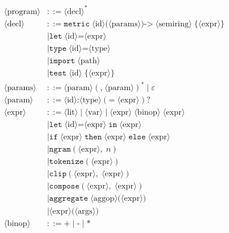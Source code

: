 \documentclass[11pt]{article}
\begin{document}
\begin{align*}
\langle\text{program}\rangle &::= \langle\text{decl}\rangle^* \\[4pt]
\langle\text{decl}\rangle &::= \texttt{metric}\; \langle\text{id}\rangle
  \texttt{(}\langle\text{params}\rangle\texttt{)}
  \texttt{->}\; \langle\text{semiring}\rangle\;
  \texttt{\{}\langle\text{expr}\rangle\texttt{\}} \\
  &\mid \texttt{let}\; \langle\text{id}\rangle \texttt{=}
  \langle\text{expr}\rangle \\
  &\mid \texttt{type}\; \langle\text{id}\rangle \texttt{=}
  \langle\text{type}\rangle \\
  &\mid \texttt{import}\; \langle\text{path}\rangle \\
  &\mid \texttt{test}\; \langle\text{id}\rangle\;
  \texttt{\{}\langle\text{expr}\rangle\texttt{\}} \\[4pt]
\langle\text{params}\rangle &::= \langle\text{param}\rangle
  (\texttt{,}\;\langle\text{param}\rangle)^* \mid \varepsilon \\
\langle\text{param}\rangle &::= \langle\text{id}\rangle \texttt{:}
  \langle\text{type}\rangle
  (\texttt{=}\;\langle\text{expr}\rangle)? \\[4pt]
\langle\text{expr}\rangle &::= \langle\text{lit}\rangle
  \mid \langle\text{var}\rangle
  \mid \langle\text{expr}\rangle\;\langle\text{binop}\rangle\;\langle\text{expr}\rangle \\
  &\mid \texttt{let}\;\langle\text{id}\rangle \texttt{=}
  \langle\text{expr}\rangle\;\texttt{in}\;\langle\text{expr}\rangle \\
  &\mid \texttt{if}\;\langle\text{expr}\rangle\;\texttt{then}\;
  \langle\text{expr}\rangle\;\texttt{else}\;\langle\text{expr}\rangle \\
  &\mid \texttt{ngram}(\langle\text{expr}\rangle,\;n) \\
  &\mid \texttt{tokenize}(\langle\text{expr}\rangle) \\
  &\mid \texttt{clip}(\langle\text{expr}\rangle,\;\langle\text{expr}\rangle) \\
  &\mid \texttt{compose}(\langle\text{expr}\rangle,\;\langle\text{expr}\rangle) \\
  &\mid \texttt{aggregate}\;\langle\text{aggop}\rangle\texttt{(}\langle\text{expr}\rangle\texttt{)} \\
  &\mid \langle\text{expr}\rangle\texttt{(}\langle\text{args}\rangle\texttt{)} \\[4pt]
\langle\text{binop}\rangle &::= \texttt{+} \mid \texttt{-} \mid \texttt{*}

\end{align*}
\end{document}
